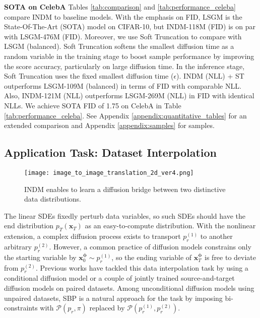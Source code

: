 \documentclass{article}
\theoremstyle{definition}
\theoremstyle{remark}
\begin{document}
	\textbf{SOTA on CelebA} Tables \ref{tab:comparison} and \ref{tab:performance_celeba} compare INDM to baseline models. With the emphasis on FID, LSGM is the State-Of-The-Art (SOTA) model on CIFAR-10, but INDM-118M (FID) is on par with LSGM-476M (FID). Moreover, we use Soft Truncation \cite{kim2022soft} to compare with LSGM (balanced). Soft Truncation softens the smallest diffusion time as a random variable in the training stage to boost sample performance by improving the score accuracy, particularly on large diffusion time. In the inference stage, Soft Truncation uses the fixed smallest diffusion time ($\epsilon$). INDM (NLL) + ST outperforms LSGM-109M (balanced) in terms of FID with comparable NLL. Also, INDM-121M (NLL) outperforms LSGM-269M (NLL) in FID with identical NLLs. We achieve SOTA FID of 1.75 on CelebA in Table \ref{tab:performance_celeba}. See Appendix \ref{appendix:quantitative_tables} for an extended comparison and Appendix \ref{appendix:samples} for samples.
	
	\subsection{Application Task: Dataset Interpolation}\label{sec:dataset_interpolation}
	
	\begin{figure*}[t]
		\vskip -0.05in
		\centering
		\texttt{[image: image\_to\_image\_translation\_2d\_ver4.png]}
		\vskip -0.05in
		\caption{INDM enables to learn a diffusion bridge between two distinctive data distributions.}
		\label{fig:translation_2d}
		\vskip -0.1in
	\end{figure*}
	
	The linear SDEs fixedly perturb data variables, so such SDEs should have the end distribution $p_{T}(\mathbf{x}_{T})$ as an easy-to-compute distribution. With the nonlinear extension, a complex diffusion process exists to transport $p_{r}^{(1)}$ to another arbitrary $p_{r}^{(2)}$. However, a common practice of diffusion models constrains only the starting variable by $\mathbf{x}_{0}^{\bm{\phi}}\sim p_{r}^{(1)}$, so the ending variable of $\mathbf{x}_{T}^{\bm{\phi}}$ is free to deviate from $p_{r}^{(2)}$. Previous works have tackled this data interpolation task by using a conditional diffusion model \cite{saharia2021palette} or a couple of jointly trained source-and-target diffusion models \cite{sasaki2021unit} on paired datasets. Among unconditional diffusion models using unpaired datasets, SBP \cite{de2021diffusion} is a natural approach for the task by imposing bi-constraints with $\mathcal{P}(p_{r},\pi)$ replaced by $\mathcal{P}(p_{r}^{(1)},p_{r}^{(2)})$.
	
\end{document}
